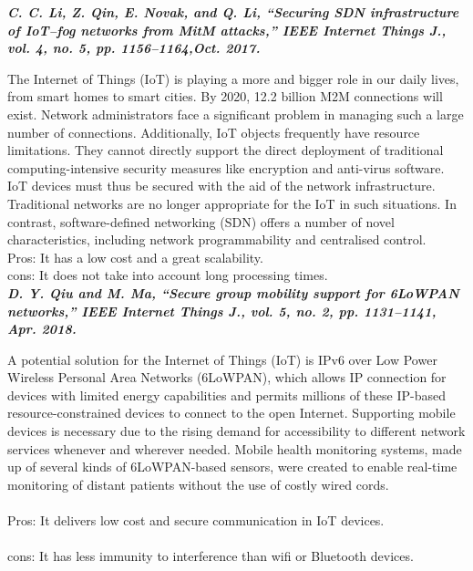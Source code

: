 \documentclass[12pt,a4paper,twocolumn,fleqn]{article}
\begin{document}
\textbf{\emph {C. C. Li, Z. Qin, E. Novak, and Q. Li, “Securing SDN infrastructure of IoT–fog networks from MitM attacks,” IEEE Internet Things J., vol. 4, no. 5, pp. 1156–1164,Oct. 2017.}}

The Internet of Things (IoT) is playing a more and bigger role in our daily lives, from smart homes to smart cities. By 2020, 12.2 billion M2M connections will exist. Network administrators face a significant problem in managing such a large number of connections. Additionally, IoT objects frequently have resource limitations. They cannot directly support the direct deployment of traditional computing-intensive security measures like encryption and anti-virus software. IoT devices must thus be secured with the aid of the network infrastructure. Traditional networks are no longer appropriate for the IoT in such situations. In contrast, software-defined networking (SDN) offers a number of novel characteristics, including network programmability and centralised control.\\
Pros: It has a low cost and a great scalability.\\
cons: It does not take into account long processing times.\\

 
\textbf{\emph {D. Y. Qiu and M. Ma, “Secure group mobility support for 6LoWPAN networks,” IEEE Internet Things J., vol. 5, no. 2, pp. 1131–1141, Apr. 2018.}}

A potential solution for the Internet of Things (IoT) is IPv6 over Low Power Wireless Personal Area Networks (6LoWPAN), which allows IP connection for devices with limited energy capabilities and permits millions of these IP-based resource-constrained devices to connect to the open Internet. Supporting mobile devices is necessary due to the rising demand for accessibility to different network services whenever and wherever needed. Mobile health monitoring systems, made up of several kinds of 6LoWPAN-based sensors, were created to enable real-time monitoring of distant patients without the use of costly wired cords.\\ \\
Pros: It delivers low cost and secure communication in IoT devices.\\
\\ 
cons: It has less immunity to interference than wifi or Bluetooth devices.
 \\ \\ \\ \\
 
\end{document}
